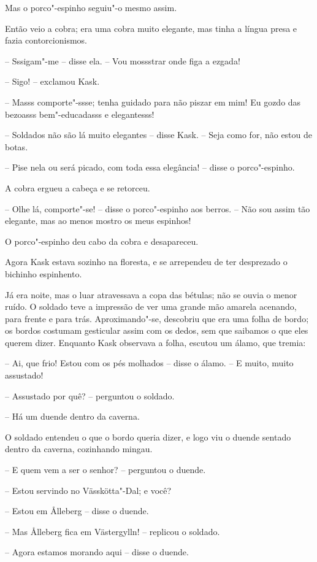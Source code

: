 Mas o porco"-espinho seguiu"-o mesmo assim.

Então veio a cobra; era uma cobra muito elegante, mas tinha a língua
presa e fazia contorcionismos.

-- Sssigam"-me -- disse ela. -- Vou mossstrar onde figa a ezgada!

-- Sigo! -- exclamou Kask.

-- Masss comporte"-ssse; tenha guidado para não piszar em mim! Eu gozdo
das bezoasss bem"-educadasss e elegantesss!

-- Soldados não são lá muito elegantes -- disse Kask.  -- Seja como for,
não estou de botas.

-- Pise nela ou será picado, com toda essa elegância! -- disse o
porco"-espinho.

A cobra ergueu a cabeça e se retorceu. 

-- Olhe lá, comporte"-se! -- disse o porco"-espinho aos berros. -- Não
sou assim tão elegante, mas ao menos mostro os meus espinhos!

O porco"-espinho deu cabo da cobra e desapareceu.

Agora Kask estava sozinho na floresta, e se arrependeu de ter desprezado
o bichinho espinhento.

Já era noite, mas o luar atravessava a copa das bétulas; não se ouvia o
menor ruído. O soldado teve a impressão de ver uma grande mão amarela acenando, para
frente e para trás. Aproximando"-se, descobriu que era uma folha de
bordo; os bordos costumam gesticular assim com os dedos, sem que
saibamos o que eles querem dizer. Enquanto Kask observava a folha,
escutou um álamo, que tremia:

-- Ai, que frio! Estou com os pés molhados -- disse o álamo. -- E muito,
muito assustado!

-- Assustado por quê? -- perguntou o soldado.

-- Há um duende dentro da caverna.

O soldado entendeu o que o bordo queria dizer, e logo viu o duende
sentado dentro da caverna, cozinhando mingau.

-- E quem vem a ser o senhor? -- perguntou o duende.

-- Estou servindo no Vässkötta"-Dal; e você?

-- Estou em \r Alleberg -- disse o duende.

-- Mas \r Alleberg fica em Västergylln! -- replicou o soldado.

-- Agora estamos morando aqui -- disse o duende.

